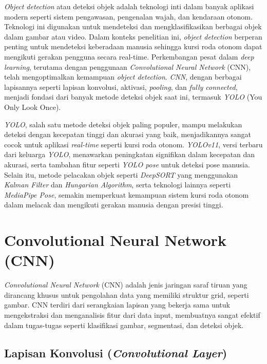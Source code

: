 \emph{Object detection} atau deteksi objek adalah teknologi inti dalam banyak aplikasi modern seperti sistem pengawasan, pengenalan wajah, dan kendaraan otonom. Teknologi ini digunakan untuk mendeteksi dan mengklasifikasikan berbagai objek dalam gambar atau video. Dalam konteks penelitian ini, \emph{object detection} berperan penting untuk mendeteksi keberadaan manusia sehingga kursi roda otonom dapat mengikuti gerakan pengguna secara real-time. Perkembangan pesat dalam \emph{deep learning}, terutama dengan penggunaan \emph{Convolutional Neural Network} (CNN), telah mengoptimalkan kemampuan \emph{object detection}. \emph{CNN}, dengan berbagai lapisannya seperti lapisan konvolusi, aktivasi, \emph{pooling}, dan \emph{fully connected}, menjadi fondasi dari banyak metode deteksi objek saat ini, termasuk \emph{YOLO} (You Only Look Once).

\emph{YOLO}, salah satu metode deteksi objek paling populer, mampu melakukan deteksi dengan kecepatan tinggi dan akurasi yang baik, menjadikannya sangat cocok untuk aplikasi \emph{real-time} seperti kursi roda otonom. \emph{YOLOv11}, versi terbaru dari keluarga \emph{YOLO}, menawarkan peningkatan signifikan dalam kecepatan dan akurasi, serta tambahan fitur seperti \emph{YOLO pose} untuk deteksi pose manusia. Selain itu, metode pelacakan objek seperti \emph{DeepSORT} yang menggunakan \emph{Kalman Filter} dan \emph{Hungarian Algorithm}, serta teknologi lainnya seperti \emph{MediaPipe Pose}, semakin memperkuat kemampuan sistem kursi roda otonom dalam melacak dan mengikuti gerakan manusia dengan presisi tinggi.

\section{Convolutional Neural Network (CNN)}
\label{sec:cnn}

\emph{Convolutional Neural Network} (CNN) adalah jenis jaringan saraf tiruan yang dirancang khusus untuk pengolahan data yang memiliki struktur grid, seperti gambar. CNN terdiri dari serangkaian lapisan yang bekerja sama untuk mengekstraksi dan menganalisis fitur dari data input, membuatnya sangat efektif dalam tugas-tugas seperti klasifikasi gambar, segmentasi, dan deteksi objek.

\subsection{Lapisan Konvolusi (\emph{Convolutional Layer})}
\label{subsec:Convolutional Layer}

